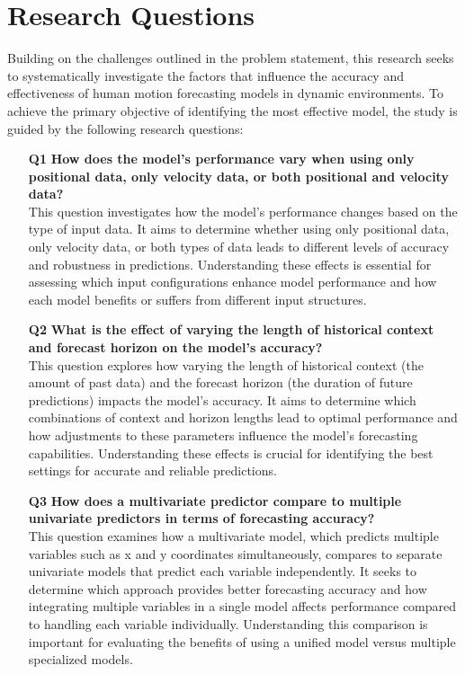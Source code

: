 \section{Research Questions}

Building on the challenges outlined in the problem statement, this research seeks to systematically investigate the factors that influence the accuracy and effectiveness of human motion forecasting models in dynamic environments. To achieve the primary objective of identifying the most effective model, the study is guided by the following research questions:


\begin{itemize}
    \item[\textbf{Q1}] \textbf{How does the model's performance vary when using only positional data, only velocity data, or both positional and velocity data?} \\
    This question investigates how the model's performance changes based on the type of input data. It aims to determine whether using only positional data, only velocity data, or both types of data leads to different levels of accuracy and robustness in predictions. Understanding these effects is essential for assessing which input configurations enhance model performance and how each model benefits or suffers from different input structures.
    
    \item[\textbf{Q2}] \textbf{What is the effect of varying the length of historical context and forecast horizon on the model's accuracy?} \\ 
    This question explores how varying the length of historical context (the amount of past data) and the forecast horizon (the duration of future predictions) impacts the model's accuracy. It aims to determine which combinations of context and horizon lengths lead to optimal performance and how adjustments to these parameters influence the model's forecasting capabilities. Understanding these effects is crucial for identifying the best settings for accurate and reliable predictions.

    \item[\textbf{Q3}] \textbf{How does a multivariate predictor compare to multiple univariate predictors in terms of forecasting accuracy?} \\
    This question examines how a multivariate model, which predicts multiple variables such as x and y coordinates simultaneously, compares to separate univariate models that predict each variable independently. It seeks to determine which approach provides better forecasting accuracy and how integrating multiple variables in a single model affects performance compared to handling each variable individually. Understanding this comparison is important for evaluating the benefits of using a unified model versus multiple specialized models.
    

\end{itemize}

